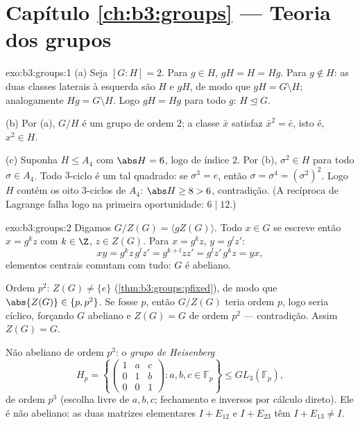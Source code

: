 \section*{Capítulo \ref{ch:b3:groups} --- Teoria dos grupos}

\begin{solution}{exo:b3:groups:1}
(a) Seja $[G:H] = 2$. Para $g \in H$, $gH = H = Hg$. Para $g \notin
H$: as duas classes laterais à
esquerda são $H$ e $gH$, de modo que $gH = G \setminus H$; analogamente $Hg = G \setminus H$. Logo
$gH = Hg$ para todo $g$: $H
\trianglelefteq G$.

(b) Por (a), $G/H$ é um grupo de ordem $2$; a classe $\bar x$
satisfaz $\bar x^2 = \bar e$, isto é, $x^2 \in H$.

(c) Suponha $H \leq A_4$ com $\abs H = 6$, logo de índice $2$. Por (b), $\sigma^2 \in H$ para
todo $\sigma \in A_4$. Todo $3$-ciclo é um tal quadrado: se $\sigma^3 = e$, então $\sigma =
\sigma^4 = (\sigma^2)^2$. Logo
$H$ contém os oito $3$-ciclos de $A_4$: $\abs H \geq 8 > 6$, contradição. (A
recíproca de Lagrange falha logo na primeira oportunidade: $6 \mid 12$.)
\end{solution}

\begin{solution}{exo:b3:groups:2}
Digamos $G/Z(G) = \langle gZ(G) \rangle$. Todo $x \in G$ se escreve então $x = g^k z$ com $k \in \Z$, $z \in Z(G)$. Para $x = g^kz$,
$y =
g^l z'$:
\[
xy = g^k z\, g^l z' = g^{k+l} z z' = g^l z'\, g^k z = yx,
\]
elementos centrais comutam com tudo: $G$ é abeliano.

Ordem $p^2$: $Z(G) \neq \{e\}$ (\cref{thm:b3:groups:pfixed}), de modo que $\abs{Z(G)} \in \{p, p^2\}$. Se fosse $p$,
então $G/Z(G)$ teria ordem $p$, logo seria cíclico, forçando
$G$ abeliano e $Z(G) =
G$ de ordem $p^2$ --- contradição. Assim $Z(G) = G$.

Não abeliano de ordem $p^3$: o \emph{grupo de Heisenberg}
\[
H_p = \left\{ \begin{pmatrix} 1 & a & c\\ 0 & 1 & b\\ 0 & 0 & 1
\end{pmatrix} : a, b, c \in \mathbb F_p \right\}
\leq GL_3(\mathbb F_p),
\]
de ordem $p^3$ (escolha livre de $a, b, c$; fechamento e inversos por
cálculo direto). Ele é não abeliano: as duas matrizes elementares $I + E_{12}$ e
$I + E_{23}$ têm  $I + E_{13} \neq I$.
\end{solution}

